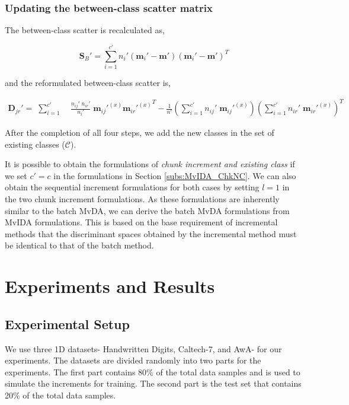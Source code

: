\subsubsection{Updating the between-class scatter matrix}
\label{ssubs:MvIDA_ChkNC_Sb}
The between-class scatter is recalculated as,

\begin{equation}
\label{eqn:4Sb}
\textbf{S}_B' = \sum_{i=1}^{c'} n_{i}' (\textbf{m}_{i}' - \textbf{m}') (\textbf{m}_{i}' - \textbf{m}')^T
\end{equation}

\noindent
and the reformulated between-class scatter is,

\begin{equation}
\label{eqn:4Djr}
\begin{split}
\textbf{D}_{jr}' = \; \sum_{i=1}^{c'} & \; \frac{n_{ij}' \; n_{ir}'}{n_{i}'} \; {\textbf{m}_{ij}'}^{(x)} {{\textbf{m}_{ir}'}^{(x)}}^T - \frac{1}{n'} \left (\sum_{i=1}^{c'} n_{ij}' \; {\textbf{m}_{ij}'}^{(x)} \right ) \left (\sum_{i=1}^{c'} n_{ir}' \; {{\textbf{m}_{ir}'}^{(x)}} \right )^T
\end{split}
\end{equation}

\noindent
After the completion of all four steps, we add the new classes in the set of existing classes ($\mathcal{C}$).

It is possible to obtain the formulations of \textit{chunk increment and existing class} if we set $c'=c$ in the formulations in Section \ref{subs:MvIDA_ChkNC}. We can also obtain the sequential increment formulations for both cases by setting $l=1$ in the two chunk increment formulations. As these formulations are inherently similar to the batch MvDA, we can derive the batch MvDA formulations from MvIDA formulations. This is based on the base requirement of incremental methods that the discriminant spaces obtained by the incremental method must be identical to that of the batch method.








\section{Experiments and Results}
\label{sec:MvIDA_Expt}

\subsection{Experimental Setup}
\label{subs:MvIDA_Expt_Setup}
We use three 1D datasets- Handwritten Digits, Caltech-7, and AwA- for our experiments. The datasets are divided randomly into two parts for the experiments. The first part contains 80\% of the total data samples and is used to simulate the increments for training. The second part is the test set that contains 20\% of the total data samples.

